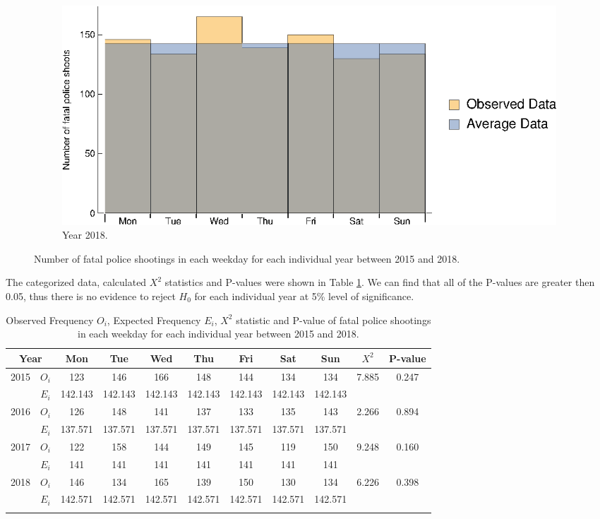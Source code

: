 \documentclass[conf]{new-aiaa}
\begin{document}
\begin{figure}[!htbp]
\begin{subfigure}{.49\textwidth}
  \centering
  \includegraphics[width=\linewidth]{q4/q4-day-2018.eps}  
  \caption{Year 2018.}
  \label{fig:q4-day-2018}
\end{subfigure}
\caption{Number of fatal police shootings in each weekday for each individual year between 2015 and 2018.}
\label{fig:q4-day-individual}
\end{figure}

The categorized data, calculated $X^2$ statistics and P-values were shown in Table \ref{tab:q4-day-individual}. We can find that all of the P-values are greater then 0.05, thus there is no evidence to reject $H_0$ for each individual year at 5\% level of significance. \medskip

\begin{table}[!htbp]
\centering
\begin{tabular}{cc|ccccccc|cc}
\toprule 
\toprule
\multicolumn{2}{c|}{Year} & Mon & Tue & Wed & Thu & Fri & Sat & Sun & $X^2$ & P-value\\
\hline
\multirow{2}{*}{2015} & $O_i$ & 123 & 146 & 166 & 148 & 144 & 134 & 134 & \multirow{2}{*}{7.885} & \multirow{2}{*}{0.247}\\
& $E_i$ & 142.143 & 142.143 & 142.143 & 142.143 & 142.143 & 142.143 & 142.143 & \\
\hline
\multirow{2}{*}{2016} & $O_i$ & 126 & 148 & 141 & 137 & 133 & 135 & 143 & \multirow{2}{*}{2.266} & \multirow{2}{*}{0.894}\\
& $E_i$ & 137.571 & 137.571 & 137.571 & 137.571 & 137.571 & 137.571 & 137.571 & \\
\hline
\multirow{2}{*}{2017} & $O_i$ & 122 & 158 & 144 & 149 & 145 & 119 & 150 & \multirow{2}{*}{9.248} & \multirow{2}{*}{0.160}\\
& $E_i$ & 141 & 141 & 141 & 141 & 141 & 141 & 141 & \\
\hline
\multirow{2}{*}{2018} & $O_i$ & 146 & 134 & 165 & 139 & 150 & 130 & 134 & \multirow{2}{*}{6.226} & \multirow{2}{*}{0.398}\\
& $E_i$ & 142.571 & 142.571 & 142.571 & 142.571 & 142.571 & 142.571 & 142.571 & \\
\bottomrule 
\bottomrule\noalign{\bigskip}
\end{tabular}
\caption{Observed Frequency $O_i$, Expected Frequency $E_i$, $X^2$ statistic and P-value of fatal police shootings in each weekday for each individual year between 2015 and 2018.}
\label{tab:q4-day-individual}
\end{table}
\end{document}
